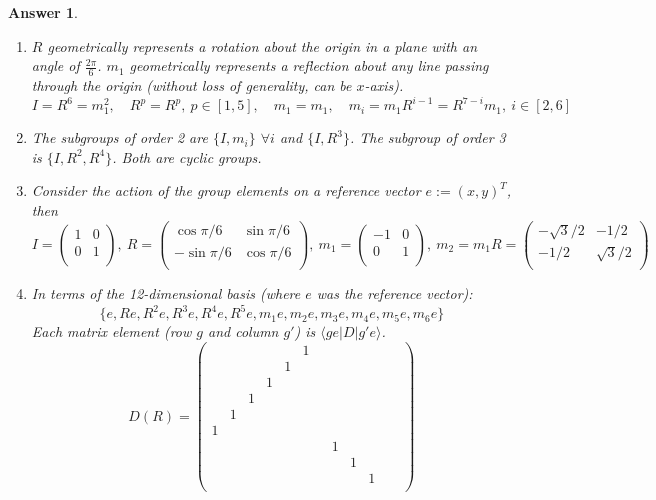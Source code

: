 \documentclass[a4paper]{article}
\newtheorem{ans}{Answer}[section]
\theoremstyle{new}
\begin{document}
\newpage
\begin{ans}\leavevmode
\begin{enumerate}[label=(\alph*)]
\item $R$ geometrically represents a rotation about the origin in a plane with an angle of $\frac{2\pi}{6}$. $m_1$ geometrically represents a reflection about any line passing through the origin (without loss of generality, can be $x$-axis).
$$I=R^6=m_1^2,\quad R^p=R^p,~p\in[1,5],\quad m_1=m_1,\quad m_i=m_1R^{i-1}=R^{7-i}m_1,~i\in[2,6]$$
\item The subgroups of order 2 are $\{I,m_i\}$ $\forall i$ and $\{I,R^3\}$. The subgroup of order 3 is $\{I,R^2,R^4\}$. Both are cyclic groups.
\item Consider the action of the group elements on a reference vector $e:=(x,y)^T$, then
$$I=\begin{pmatrix}1&0\\0&1\\\end{pmatrix},~R=\begin{pmatrix}\cos\pi/6 &\sin\pi/6\\-\sin\pi/6&\cos\pi/6\\\end{pmatrix},~m_1=\begin{pmatrix}-1&0\\0&1\\\end{pmatrix},~m_2=m_1R=\begin{pmatrix}-\sqrt{3}/2&-1/2\\-1/2&\sqrt{3}/2\\\end{pmatrix}$$
\item In terms of the 12-dimensional basis (where $e$ was the reference vector): 
$$\{e,Re,R^2e,R^3e,R^4e,R^5e,m_1e,m_2e,m_3e,m_4e,m_5e,m_6e\}$$
Each matrix element (row $g$ and column $g'$) is $\langle ge|D|g'e\rangle$.
\setcounter{MaxMatrixCols}{20}
$$D(R)=\begin{pmatrix}
& & & & &1 & & & & & &\\
& & & &1 & & & & & & &\\
& & &1 & & & & & & & &\\
& &1 & & & & & & & & &\\
& 1& & & & & & & & & &\\
1& & & & & & & & & & &\\
& & & & & & &1 & & & &\\
& & & & & & & &1 & & &\\
& & & & & & & & &1 & &\\

\end{pmatrix}$$
\end{enumerate}
\end{ans}
\end{document}
